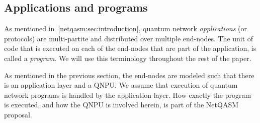 \subsection{Applications and programs}
As mentioned in~\cref{netqasm:sec:introduction}, quantum network \textit{applications} (or protocols) are multi-partite and distributed over multiple end-nodes.
The unit of code that is executed on each of the end-nodes that are part of the application, is called a \textit{program}.
We will use this terminology throughout the rest of the paper.

As mentioned in the previous section, the end-nodes are modeled such that there is an application layer and a \ac{QNPU}. We assume that execution of quantum network programs is handled by the application layer.
How exactly the program is executed, and how the \ac{QNPU} is involved herein, is part of the \ac{NetQASM} proposal.
